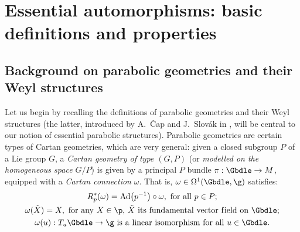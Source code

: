 \section{Essential automorphisms: basic def\/initions and properties}\label{section2}

\subsection{Background on parabolic geometries and their Weyl structures}\label{section2.1}

Let us begin by recalling the def\/initions of parabolic geometries and their Weyl structures (the latter, introduced by A.~\v{C}ap and J.~Slov\'ak in \cite{CS03}, will be central to our notion of essential parabolic structures). Parabolic geometries are certain types of Cartan geometries, which are very general: given a closed subgroup $P$ of a Lie group $G$, a \textit{Cartan geometry of type $(G,P)$} (or \textit{modelled on the homogeneous space $G/P$}) is given by a principal $P$ bundle $\pi: \Gbdle \rightarrow M$, equipped with a \textit{Cartan connection} $\omega$. That is, $\omega \in \Omega^1(\Gbdle,\g)$ satisf\/ies:
\begin{gather}
R_p^*(\omega) = \mathrm{Ad}\big(p^{-1}\big) \circ \omega, \,\, \mathrm{for} \,\, \mathrm{all} \,\, p \in P; \label{ad-inv}\\
\omega(\tilde{X}) = X, \,\, \mathrm{for} \,\, \mathrm{any} \,\, X \in \p, \, \tilde{X} \,\, \mathrm{its} \,\, \mathrm{fundamental} \,\, \mathrm{vector} \,\, \mathrm{f\/ield} \,\, \mathrm{on} \,\, \Gbdle; \label{fund-vfs}\\
\omega(u) : T_u\Gbdle \rightarrow \g \,\, \mathrm{is} \,\, \mathrm{a} \,\, \mathrm{linear} \,\, \mathrm{isomorphism} \,\, \mathrm{for} \,\, \mathrm{all} \,\,u \in \Gbdle. \label{parallelism}
\end{gather}

